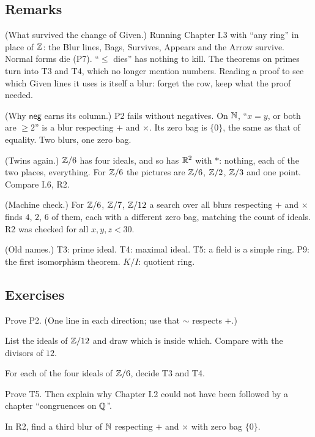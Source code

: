 \subsection*{Remarks}

\begin{lines}
\item[\lab{R1}] (What survived the change of Given.) Running Chapter I.3 with ``any ring'' in place of $\mathbb{Z}$: the Blur lines, Bags, Survives, Appears and the Arrow survive. Normal forms die (P7). ``$\le$ dies'' has nothing to kill. The theorems on primes turn into T3 and T4, which no longer mention numbers. Reading a proof to see which Given lines it uses is itself a blur: forget the row, keep what the proof needed.
\item[\lab{R2}] (Why $\mathsf{neg}$ earns its column.) P2 fails without negatives. On $\mathbb{N}$, ``$x = y$, or both are $\ge 2$'' is a blur respecting $+$ and $\times$. Its zero bag is $\{0\}$, the same as that of equality. Two blurs, one zero bag.
\item[\lab{R3}] (Twins again.) $\mathbb{Z}/6$ has four ideals, and so has $\mathbb{R}^2$ with $\ast$: nothing, each of the two places, everything. For $\mathbb{Z}/6$ the pictures are $\mathbb{Z}/6$, $\mathbb{Z}/2$, $\mathbb{Z}/3$ and one point. Compare I.6, R2.
\item[\lab{R4}] (Machine check.) For $\mathbb{Z}/6$, $\mathbb{Z}/7$, $\mathbb{Z}/12$ a search over all blurs respecting $+$ and $\times$ finds $4$, $2$, $6$ of them, each with a different zero bag, matching the count of ideals. R2 was checked for all $x, y, z < 30$.
\item[\lab{R5}] (Old names.) T3: prime ideal. T4: maximal ideal. T5: a field is a simple ring. P9: the first isomorphism theorem. $K/I$: quotient ring.
\end{lines}

\subsection*{Exercises}

\begin{lines}
\item[\lab{E1}] Prove P2. (One line in each direction; use that $\sim$ respects $+$.)
\item[\lab{E2}] List the ideals of $\mathbb{Z}/12$ and draw which is inside which. Compare with the divisors of $12$.
\item[\lab{E3}] For each of the four ideals of $\mathbb{Z}/6$, decide T3 and T4.
\item[\lab{E4}] Prove T5. Then explain why Chapter I.2 could not have been followed by a chapter ``congruences on $\mathbb{Q}$''.
\item[\lab{E5}] In R2, find a third blur of $\mathbb{N}$ respecting $+$ and $\times$ with zero bag $\{0\}$.
\end{lines}

